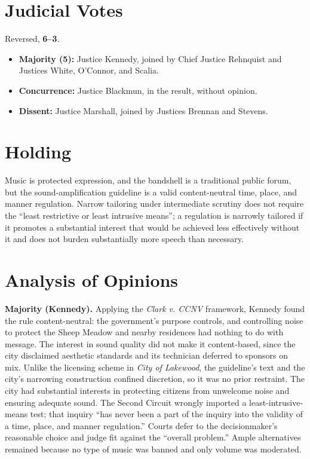 \documentclass[12pt]{article}
\begin{document}
\section{Judicial Votes}

Reversed, \textbf{6--3}.
\begin{itemize}
\item \textbf{Majority (5):} Justice Kennedy, joined by Chief Justice Rehnquist and Justices White, O'Connor, and Scalia.
\item \textbf{Concurrence:} Justice Blackmun, in the result, without opinion.
\item \textbf{Dissent:} Justice Marshall, joined by Justices Brennan and Stevens.
\end{itemize}

\section{Holding}

Music is protected expression, and the bandshell is a traditional public forum, but the sound-amplification guideline is a valid content-neutral time, place, and manner regulation. Narrow tailoring under intermediate scrutiny does not require the ``least restrictive or least intrusive means''; a regulation is narrowly tailored if it promotes a substantial interest that would be achieved less effectively without it and does not burden substantially more speech than necessary.

\section{Analysis of Opinions}

\textbf{Majority (Kennedy).} Applying the \textit{Clark v. CCNV} framework, Kennedy found the rule content-neutral: the government's purpose controls, and controlling noise to protect the Sheep Meadow and nearby residences had nothing to do with message. The interest in sound quality did not make it content-based, since the city disclaimed aesthetic standards and its technician deferred to sponsors on mix. Unlike the licensing scheme in \textit{City of Lakewood}, the guideline's text and the city's narrowing construction confined discretion, so it was no prior restraint. The city had substantial interests in protecting citizens from unwelcome noise and ensuring adequate sound. The Second Circuit wrongly imported a least-intrusive-means test; that inquiry ``has never been a part of the inquiry into the validity of a time, place, and manner regulation.'' Courts defer to the decisionmaker's reasonable choice and judge fit against the ``overall problem.'' Ample alternatives remained because no type of music was banned and only volume was moderated.
\end{document}
